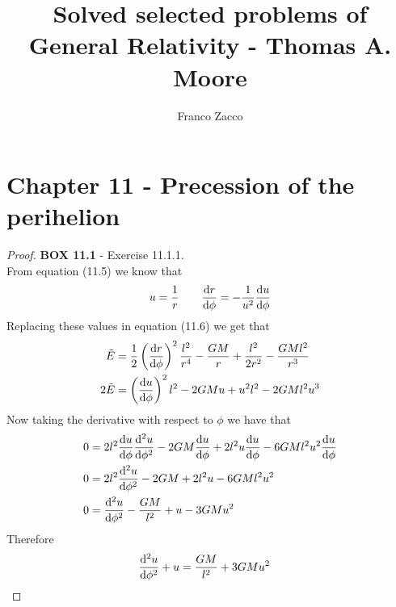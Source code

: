 \documentclass[11pt]{article}
\title{\textbf{Solved selected problems of General Relativity - Thomas A. Moore}}
\author{Franco Zacco}
\date{}
\theoremstyle{definition}
\begin{document}
\maketitle
\thispagestyle{empty}

\section*{Chapter 11 - Precession of the perihelion}

\begin{proof}{\textbf{BOX 11.1} - Exercise 11.1.1.}\\
    From equation (11.5) we know that
    \begin{align*}
        u = \frac{1}{r} \quad\quad \dv{r}{\phi} = -\frac{1}{u^2}\dv{u}{\phi} 
    \end{align*}
    Replacing these values in equation (11.6) we get that 
    \begin{align*}
        \tilde{E} &= \frac{1}{2}\left(\dv{r}{\phi}\right)^2\frac{l^2}{r^4}
        - \frac{GM}{r} + \frac{l^2}{2r^2} - \frac{GMl^2}{r^3}\\
        2\tilde{E} &= \left(\dv{u}{\phi}\right)^2l^2 - 2GMu + u^2l^2 - 2GMl^2u^3
    \end{align*}
    Now taking the derivative with respect to $\phi$ we have that
    \begin{align*}
        0 &= 2l^2\dv{u}{\phi}\dv[2]{u}{\phi}
        - 2GM\dv{u}{\phi} + 2l^2u\dv{u}{\phi} - 6GMl^2u^2\dv{u}{\phi}\\
        0 &= 2l^2\dv[2]{u}{\phi} - 2GM + 2l^2u - 6GMl^2u^2\\
        0 &= \dv[2]{u}{\phi} - \frac{GM}{l^2} + u - 3GMu^2
    \end{align*}
    Therefore
    \begin{align*}
        \dv[2]{u}{\phi} + u &= \frac{GM}{l^2} + 3GMu^2
    \end{align*}
\end{proof}
\cleardoublepage
\end{document}
